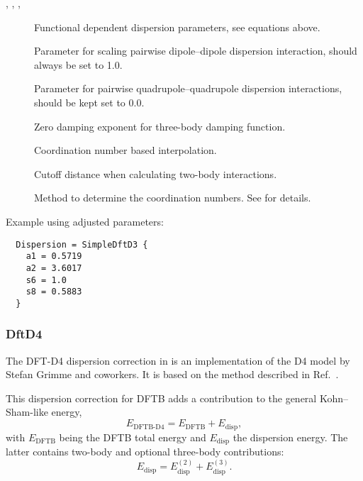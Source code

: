 \begin{description}
\item[, , , ] Functional dependent dispersion
  parameters, see equations above.

\item[] Parameter for scaling pairwise dipole--dipole dispersion
  interaction, should always be set to 1.0.

\item[] Parameter for pairwise quadrupole--quadrupole dispersion
  interactions, should be kept set to 0.0.

\item[] Zero damping exponent for three-body damping function.

\item[] Coordination number based interpolation.

\item[]  Cutoff distance when
  calculating two-body interactions.

\item[] Method to determine the coordination numbers. See
   for details.

\end{description}

Example using adjusted parameters:
\begin{verbatim}
  Dispersion = SimpleDftD3 {
    a1 = 0.5719
    a2 = 3.6017
    s6 = 1.0
    s8 = 0.5883
  }
\end{verbatim}


\subsubsection{DftD4}
\label{sec:dftbp.DftD4}

The DFT-D4 dispersion correction in \dftbp{} is an implementation of the D4
model by Stefan Grimme and coworkers. It is based on the method described in
Ref.~\cite{caldeweyher-jcp-150-154122}.

This dispersion correction for DFTB adds a contribution to the general
Kohn--Sham-like energy,
\begin{equation*}
  E_{\text{DFTB-D4}} = E_{\text{DFTB}} + E_{\text{disp}},
\end{equation*}
with $E_{\text{DFTB}}$ being the DFTB total energy and $E_{\text{disp}}$ the
dispersion energy. The latter contains two-body and optional three-body
contributions:
\begin{equation*}
  E_{\text{disp}} = E_{\text{disp}}^{(2)} + E_{\text{disp}}^{(3)}.
\end{equation*}

